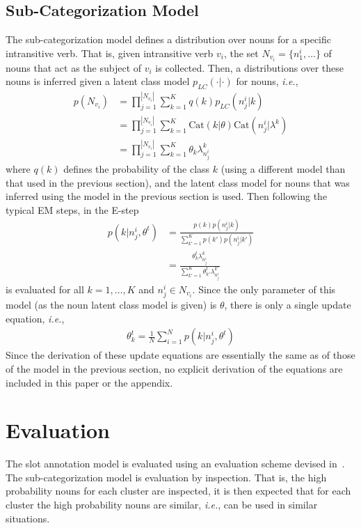 \documentclass[11pt]{scrartcl}
\newcommand{\ie}{\textit{i.e.}}
\newcommand{\Cat}{\text{Cat}}
\begin{document}
\subsection{Sub-Categorization Model} %
\label{sec:nounclasses}
The sub-categorization model defines a distribution over nouns for a
specific intransitive verb. That is, given intransitive verb $v_i$,
the set $N_{v_i} = \{n^i_1, \ldots\}$ of nouns that act as the subject
of $v_i$ is collected. Then, a distributions over these nouns is
inferred given a latent class model $p_{LC}(\cdot|\cdot)$ for nouns, \ie,
\begin{align*}
  p(N_{v_i}) &= \prod_{j=1}^{|N_{v_i}|} \sum_{k=1}^K q(k)p_{LC}(n^i_j|k) \\
            &= \prod_{j=1}^{|N_{v_i}|} \sum_{k=1}^K \Cat(k|\theta)\Cat(n^i_j|\lambda^k) \\
            &= \prod_{j=1}^{|N_{v_i}|} \sum_{k=1}^K \theta_k \lambda^k_{n^i_j}
\end{align*}
where $q(k)$ defines the probability of the class $k$ (using a
different model than that used in the previous section), and the
latent class model for nouns that was inferred using the model in the
previous section is used. Then following the typical EM steps, in the E-step
\begin{align*}
    p(k|n^i_j, \theta^t) &= \frac{p(k)p(n^i_j|k)}{\sum_{k'=1}^K  p(k')p(n^i_j|k')} \\
               &= \frac{\theta^t_{k}\lambda^{k}_{n^i_j}}{\sum_{k'=1}^K  \theta^t_{k'}\lambda^{k'}_{n^i_j}}
\end{align*}
is evaluated for all $k = 1,\ldots,K$ and $n^i_j \in N_{v_i}$. Since
the only parameter of this model (as the noun latent class model is
given) is $\theta$, there is only a single update equation, \ie,
\begin{align*}
  \theta^t_k = \frac{1}{N} \sum_{i=1}^N p(k | n^i_j, \theta^t)
\end{align*}
Since the derivation of these update equations are essentially the
same as of those of the model in the previous section, no explicit
derivation of the equations are included in this paper or the
appendix.

\section{Evaluation} %
The slot annotation model is evaluated using an evaluation scheme
devised in~\cite{rooth1999inducing}. The sub-categorization model is
evaluation by inspection. That is, the high probability nouns for each
cluster are inspected, it is then expected that for each cluster the
high probability nouns are similar, \ie, can be used in similar
situations.
\end{document}
